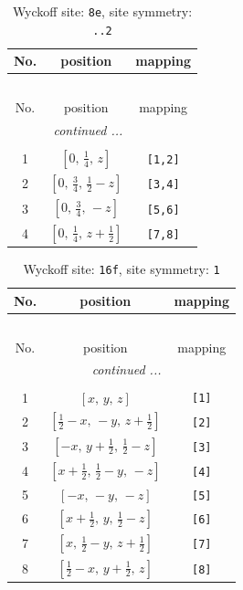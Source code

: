 \documentclass[fleqn,8pt]{jsarticle}
\begin{document}
\renewcommand{\arraystretch}{1.2}
\begin{longtable}{ccc}
\caption{Wyckoff site: {\tt 8e}, site symmetry: {\tt ..2}}
 \\
 \hline \hline
No. & position & mapping \\ \hline \endfirsthead

\multicolumn{2}{l}{\tablename\ \thetable{}} \\
 \hline \hline
No. & position & mapping \\ \hline \endhead

 \hline \hline
\multicolumn{2}{r}{\footnotesize\it continued ...} \\ \endfoot

 \hline \hline
\multicolumn{2}{r}{} \\ \endlastfoot

1 & $\left[ 0,\, \frac{1}{4},\, z \right]$ & {\tt [1,2]} \\ \hline
2 & $\left[ 0,\, \frac{3}{4},\, \frac{1}{2} - z \right]$ & {\tt [3,4]} \\ \hline
3 & $\left[ 0,\, \frac{3}{4},\, - z \right]$ & {\tt [5,6]} \\ \hline
4 & $\left[ 0,\, \frac{1}{4},\, z + \frac{1}{2} \right]$ & {\tt [7,8]} \\
\end{longtable}
\renewcommand{\arraystretch}{1.2}
\begin{longtable}{ccc}
\caption{Wyckoff site: {\tt 16f}, site symmetry: {\tt 1}}
 \\
 \hline \hline
No. & position & mapping \\ \hline \endfirsthead

\multicolumn{2}{l}{\tablename\ \thetable{}} \\
 \hline \hline
No. & position & mapping \\ \hline \endhead

 \hline \hline
\multicolumn{2}{r}{\footnotesize\it continued ...} \\ \endfoot

 \hline \hline
\multicolumn{2}{r}{} \\ \endlastfoot

1 & $\left[ x,\, y,\, z \right]$ & {\tt [1]} \\ \hline
2 & $\left[ \frac{1}{2} - x,\, - y,\, z + \frac{1}{2} \right]$ & {\tt [2]} \\ \hline
3 & $\left[ - x,\, y + \frac{1}{2},\, \frac{1}{2} - z \right]$ & {\tt [3]} \\ \hline
4 & $\left[ x + \frac{1}{2},\, \frac{1}{2} - y,\, - z \right]$ & {\tt [4]} \\ \hline
5 & $\left[ - x,\, - y,\, - z \right]$ & {\tt [5]} \\ \hline
6 & $\left[ x + \frac{1}{2},\, y,\, \frac{1}{2} - z \right]$ & {\tt [6]} \\ \hline
7 & $\left[ x,\, \frac{1}{2} - y,\, z + \frac{1}{2} \right]$ & {\tt [7]} \\ \hline
8 & $\left[ \frac{1}{2} - x,\, y + \frac{1}{2},\, z \right]$ & {\tt [8]} \\
\end{longtable}
\end{document}
